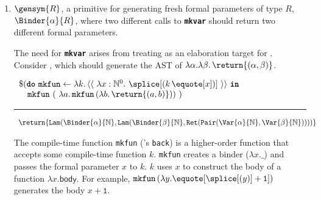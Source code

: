 \begin{enumerate}

\item $\gensym{R}$, a primitive for generating fresh formal parameters of type $R$, $\Binder{\alpha}{R}$, where two different calls to \textbf{\texttt{mkvar}} should return two different formal parameters.

The need for \textbf{\texttt{mkvar}} arises from treating \coreLang{} as an elaboration target for \sourceLang{}. Consider , which should generate the AST of $\lambda \alpha. \lambda \beta. \, \return{(\alpha, \beta)}$.

\begin{code}
\begin{sourcelst}
$\begin{array}{l}
\$(\textbf{\texttt{do}} \, \, \texttt{mkfun} \leftarrow {\lambda k. \, {\langle\langle\,\, \lambda x: \mathbb{N}^0. \,\, \splice[(k \, {\equote[x]})]\,\, \rangle\rangle}} \, \, \textbf{\texttt{in}} \\
\quad \texttt{mkfun} \,\, (\,\, \lambda a. \, \texttt{mkfun} \, (\lambda b. \, \return{(a, b)})) \,\, )
\end{array}$

\vspace{2mm} 
\textcolor{sourceComment}{\hrule height 0.2mm \relax}
\vspace{2mm} 

\textcolor{sourceComment}{$\begin{array}{l}\return{\texttt{Lam}(\Binder{\alpha}{\mathbb{N}}, \texttt{Lam}(\Binder{\beta}{\mathbb{N}}, \texttt{Ret}(\texttt{Pair}(\Var{\alpha}{\mathbb{N}}, \Var{\beta}{\mathbb{N}}))))}\end{array}$}
\end{sourcelst}
%
\label{listing:source-gensym}
\end{code}

The compile-time function \texttt{mkfun} (\citeauthor{taha-1999}'s \citep{taha-1999} \texttt{back}) is a higher-order function that accepts some compile-time function $k$. \texttt{mkfun} creates a binder ($\lambda x. \_$) and passes the formal parameter $x$ to $k$. $k$ uses $x$ to construct the \textsf{body} of a function $\lambda x. \textsf{body}$. For example, $\texttt{mkfun} \,  (\lambda y. \equote[{\splice[(y)]} + \texttt{1}])$ generates the body $x + \texttt{1}$.


\end{enumerate}

